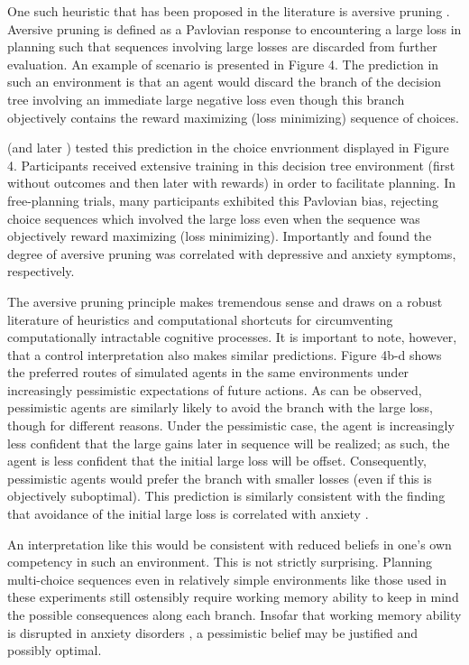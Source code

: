 \documentclass[11pt]{article} %
\begin{document}
One such heuristic that has been proposed in the literature is aversive pruning
\citep{Huys2012}. Aversive pruning is defined as a Pavlovian response to encountering
a large loss in planning such that sequences involving large losses are discarded
from further evaluation. An example of scenario is presented in Figure 4. The prediction
in such an environment is that an agent would discard the branch of the decision
tree involving an immediate large negative loss even though this branch objectively
contains the reward maximizing (loss minimizing) sequence of choices.

\cite{Huys2012} (and later \cite{Lally2017}) tested this prediction in the
choice envrionment displayed in Figure 4. Participants received extensive training
in this decision tree environment (first without outcomes and then later with
rewards) in order to facilitate planning. In free-planning trials, many participants
exhibited this Pavlovian bias, rejecting choice sequences which involved the large
loss even when the sequence was objectively reward maximizing (loss minimizing).
Importantly \cite{Huys2012} and \cite{Lally2017} found the degree of aversive
pruning was correlated with depressive and anxiety symptoms, respectively.

The aversive pruning principle makes tremendous sense and draws on a robust literature
of heuristics and computational shortcuts for circumventing computationally intractable
cognitive processes. It is important to note, however, that a control interpretation
also makes similar predictions. Figure 4b-d shows the preferred routes of simulated
agents in the same environments under increasingly pessimistic expectations of
future actions. As can be observed, pessimistic agents are similarly likely to avoid
the branch with the large loss, though for different reasons. Under the pessimistic case,
the agent is increasingly less confident that the large gains later in
sequence will be realized; as such, the agent is less confident that the initial
large loss will be offset. Consequently, pessimistic agents would prefer the branch
with smaller losses (even if this is objectively suboptimal). This prediction
is similarly consistent with the finding that avoidance of the initial large loss
is correlated with anxiety \cite{Lally2017}.

An interpretation like this would be consistent with reduced beliefs in one's
own competency in such an environment. This is not strictly surprising. Planning
multi-choice sequences even in relatively simple environments like those used
in these experiments still ostensibly require working memory ability to keep in
mind the possible consequences along each branch. Insofar that working memory
ability is disrupted in anxiety disorders \citep{Moran2016}, a pessimistic belief
may be justified and possibly optimal.
\end{document}
